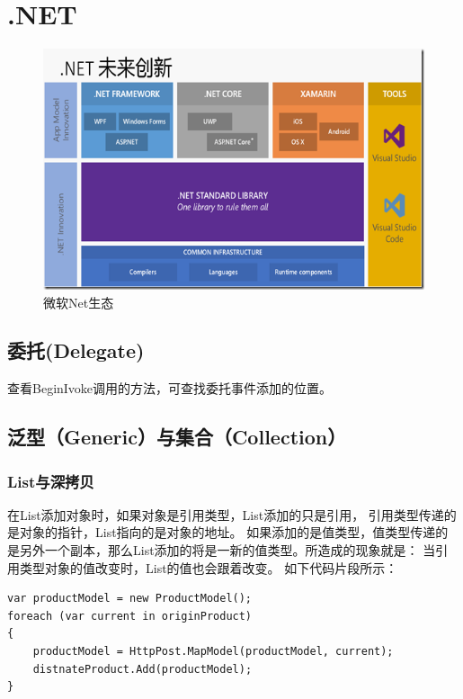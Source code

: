 \documentclass{book}
\begin{document}
\chapter{.NET}

\clearpage
\mbox{}         
\clearpage

\begin{figure}[htbp]
	\centering
	\includegraphics[scale=0.8]{NetInfrastracture.png}
	\caption{微软Net生态}
	\label{fig:NetInfrastracture}
\end{figure}


\section{委托(Delegate)}

查看BeginIvoke调用的方法，可查找委托事件添加的位置。

\section{泛型（Generic）与集合（Collection）}

\subsection{List与深拷贝}

在List添加对象时，如果对象是引用类型，List添加的只是引用，
引用类型传递的是对象的指针，List指向的是对象的地址。
如果添加的是值类型，值类型传递的是另外一个副本，那么List添加的将是一新的值类型。所造成的现象就是：
当引用类型对象的值改变时，List的值也会跟着改变。
如下代码片段所示：

\begin{lstlisting}[language={[Sharp]C},caption=List添加对象引用示例]
var productModel = new ProductModel();
foreach (var current in originProduct)
{    
    productModel = HttpPost.MapModel(productModel, current);
    distnateProduct.Add(productModel);
}
\end{lstlisting}
\end{document}
